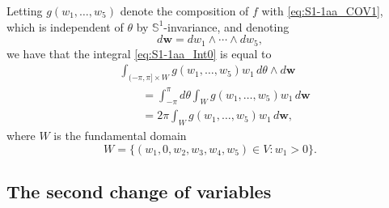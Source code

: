 \documentclass[twoside]{amsart}
\theoremstyle{definition}
\theoremstyle{remark}
\numberwithin{equation}{section}
\newcommand{\Sp}{\mathbb{S}}
\begin{document}
Letting $g(w_1,\ldots,w_5)$ denote the composition of $f$ with \eqref{eq:S1-1aa_COV1}, which is independent of $\theta$ by $\Sp^1$-invariance,
and denoting
\[
    d\mathbf{w} =   dw_1 \wedge \cdots \wedge dw_5,
\]
we have that the integral \eqref{eq:S1-1aa_Int0} is equal to
\begin{align}
    \nonumber
    &\int_{(-\pi,\pi]\times W} g(w_1, \ldots, w_5) w_1 \, d\theta \wedge d\mathbf{w}
    \\
    \nonumber
    &\qquad=    \int_{-\pi}^{\pi} d\theta \int_W g(w_1, \ldots, w_5) w_1 \, d\mathbf{w}
    \\
    \label{eq:S1-1aa_Int1}
    &\qquad=    2\pi \int_W g(w_1, \ldots, w_5) w_1 \, d\mathbf{w},
\end{align}
where $W$ is the fundamental domain
\[
    W = \{ (w_1, 0, w_2, w_3, w_4, w_5) \in V : w_1 > 0 \}.
\]


\subsection{The second change of variables}
\label{subsec:S1-1aa_COV2}
\end{document}
